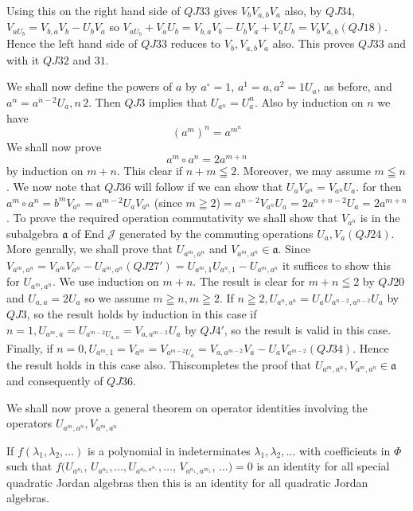 Using this on the right hand side of $QJ33$ gives $V_b V_{a,b}V_a$
also, by $QJ 34$, $V_{aU_{b}}=V_{b,a}V_b-U_bV_a$ so $V_{aU_{b}}+V_a
U_b=V_{b,a}V_b-U_bV_a+V_aU_b=V_bV_{a,b}(QJ18)$. Hence the left hand
side of $QJ33$ reduces to $V_b, V_{a,b} V_a$ also\pageoriginale . This
proves $QJ33$ and with it $QJ32$ and $31$. 

We shall now define the powers of $a$ by $a^{\circ}=1$, $a^{1}=a,a^{2}=1
U_a$, as before, and $a^{n}=a^{n-2}U_{a},n\, 2$. Then $QJ3$ implies
that $U_{a^{n}}=U^{n}_a$. Also by induction on $n$ we have 
\begin{equation*}
(a^{m})^{n}=a^{m^{n}}\tag{QJ 35}
\end{equation*}
We shall now prove
\begin{equation*}
a^{m}\circ a^{n}=2a^{m+n}\tag{QJ 36}
\end{equation*}
by induction on $m+n$. This clear if $n+m\leqq 2$. Moreover, we may
assume $m\leqq n$. We now note that $QJ 36$ will follow if we can show
that $U_aV_{a^{n}}=V_{a^{n}}U_a$. for then $a^{m}\circ
a^{n}=b^{m}V_{a^{n}}=a^{m-2}U_aV_{a^{n}}$ (since $m\geqq
2$)$=a^{n-2}V_{a^{n}}U_a=2a^{n+n-2}U_a=2a^{m+n}$. To prove the
required operation commutativity we shall show that $V_{a^{n}}$ is in
the subalgebra $\mathfrak{a}$ of End $\mathscr{J}$ generated by the
commuting operations $U_a, V_a(QJ 24)$. More genrally, we shall prove
that $U_{a^{m},a^{n}}$ and $V_{a^{m},a^{n}}\in \mathfrak{a}$. Since
$V_{a^{m},a^{n}}= V_{a^{m}} V_{a^{n}}-U_{a^{m},a^{n}}(QJ
27')=U_{a^{m},1}U_{a^{n},1}-U_{a^{m},a^{n}}$ it suffices to show this
for $U_{a^{m},a^{n}}$. We use induction on $m+n$. The result is clear
for $m+n\leqq 2$ by $QJ 20$ and $U_{a,a}=2U_a$ so we assume $m\geqq n,
m\geqq 2$. If $n\geqq 2, U_{a^{n},a^{n}}=U_aU_{a^{n-2},a^{n-2}}U_a$ by
$QJ3$, so the result holds by induction in this case if $n=1,
U_{a^{m},a}=U_{a^{m-2}U_{a,a}}=V_{a,a^{m-2}}U_a$ by $QJ4'$, so the
result is valid in this case. Finally, if $n=0,
U_{a^{m},1}=V_{a^{m}}=V_{a^{m-2}U_a}=V_{a,a^{m-2}}V_a-U_a
V_{a^{m-2}}(QJ 34)$. Hence the result holds in this case also. 
This\pageoriginale completes the proof that
$U_{a^{m},a^{n}},V_{a^{m},a^{n}}\in \mathfrak{a}$ and consequently of
$QJ 36$. 

We shall now prove a general theorem on operator identities involving
the operators $U_{a^{m},a^{n}},V_{a^{m},a^{n}}$ 

\begin{thm}\label{c1:thm3}
  If  $f(\lambda_1, \lambda_2,\ldots)$ is a polynomial in
  indeterminates $\lambda_1,\lambda_2,\dots$ with coefficients in
  $\Phi$ such that
  $f(U_{a^{n_{1}}}$,
  $U_{a^{n_{2}}},\ldots,U_{a^{n_{n},a^{m_{n}}}},\ldots$,
  $V_{a^{n_{1}},a^{m_{1}}}$, $\ldots)=0$ 
  is an identity for all special quadratic Jordan algebras then this
  is an identity for all quadratic Jordan algebras. 
\end{thm}

